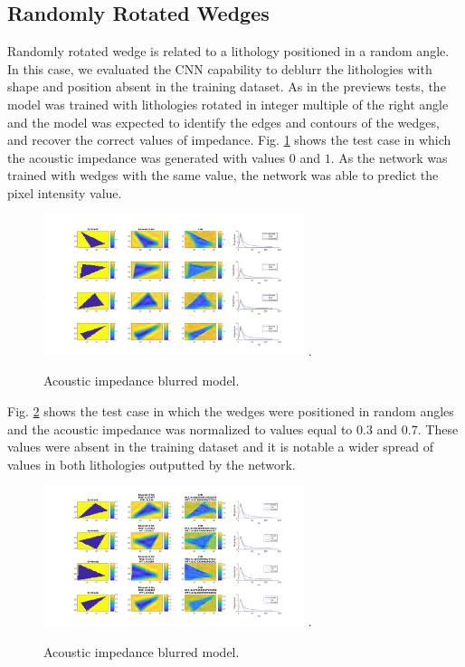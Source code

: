 \documentclass[conference,compsoc]{IEEEtran}
\begin{document}
\subsection{Randomly Rotated Wedges}
Randomly rotated wedge is related to a lithology positioned in a random angle.
In this case, we evaluated the CNN capability to deblurr the lithologies with shape and position absent
in the training dataset. As in the previews tests, the model was trained with lithologies rotated
in integer multiple of the right angle and the model was expected to identify the edges and contours of the wedges,
and recover the correct values of impedance.
Fig. \ref{fig_scenario4} shows the test case in which the acoustic impedance was generated with values $0$ and $1$.
As the network was trained with wedges with the same value, the network was able to predict
the pixel intensity value.
\begin{figure}[!t]
\centering
\includegraphics[width=3.0in]{Figs/Caso4}
\DeclareGraphicsExtensions.
\caption{Acoustic impedance blurred model.}
\label{fig_scenario4}
\end{figure}

Fig. \ref{fig_scenario3} shows the test case in which the wedges were positioned in random angles and the acoustic impedance
was normalized to values equal to $0.3$ and $0.7$. These values were absent in the training dataset and it
is notable a wider spread of values in both lithologies outputted by the network.
\begin{figure}[!t]
\centering
\includegraphics[width=3.0in]{Figs/Caso3}
\DeclareGraphicsExtensions.
\caption{Acoustic impedance blurred model.}
\label{fig_scenario3}
\end{figure}
%
%
\end{document}
